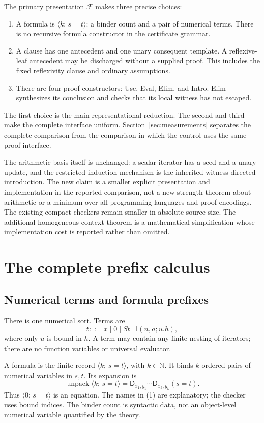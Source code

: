 \documentclass[11pt]{article}
\theoremstyle{definition}\newtheorem{definition}[theorem]{Definition}
\theoremstyle{remark}\newtheorem{remark}[theorem]{Remark}
\newcommand{\I}{\mathsf I}
\newcommand{\D}{\mathsf D}
\newcommand{\F}{\mathcal F}
\newcommand{\Eq}[3]{\langle #1;\,#2=#3\rangle}
\begin{document}
The primary presentation $\F$ makes three precise choices:
\begin{enumerate}
\item A formula is $\Eq{k}{s}{t}$: a binder count and a pair of numerical
terms. There is no recursive formula constructor in the certificate grammar.
\item A clause has one antecedent and one unary consequent template. A
reflexive-leaf antecedent may be discharged without a supplied proof.
This includes the fixed reflexivity clause and ordinary assumptions.
\item There are four proof constructors: Use, Eval, Elim, and Intro.
Elim synthesizes its conclusion and checks that its local witness has not
escaped.
\end{enumerate}
The first choice is the main representational reduction. The second and
third make the complete interface uniform. Section~\ref{sec:measurements}
separates the complete comparison from the comparison in which the control
uses the same proof interface.

The arithmetic basis itself is unchanged: a scalar iterator has a seed
and a unary update, and the restricted induction mechanism is the inherited
witness-directed introduction. The new claim is a smaller explicit
presentation and implementation in the reported comparison, not a new
strength theorem about arithmetic or a minimum over all programming
languages and proof encodings. The existing compact checkers remain
smaller in absolute source size. The additional homogeneous-context theorem
is a mathematical simplification whose implementation cost is reported
rather than omitted.

\section{The complete prefix calculus}
\label{sec:calculus}

\subsection{Numerical terms and formula prefixes}

There is one numerical sort. Terms are
\[
 t ::= x\mid 0\mid St\mid\I(n,a;u.h),
\]
where only $u$ is bound in $h$. A term may contain any finite nesting of
iterators; there are no function variables or universal evaluator.

A formula is the finite record $\Eq{k}{s}{t}$, with $k\in\mathbb N$.
It binds $k$ ordered pairs of numerical variables in $s,t$. Its expansion is
\[
 \operatorname{unpack}\Eq{k}{s}{t}
   =\D_{x_1,y_1}\cdots\D_{x_k,y_k}(s=t).
 \tag{1}\label{eq:unpack}
\]
Thus $\Eq{0}{s}{t}$ is an equation. The names in (1) are explanatory;
the checker uses bound indices. The binder count is syntactic data, not an
object-level numerical variable quantified by the theory.
\end{document}
